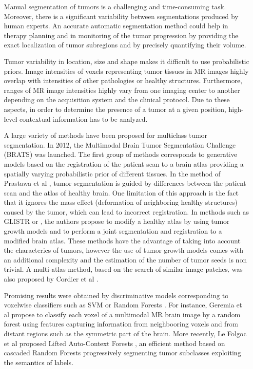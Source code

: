 \documentclass[preprint,12pt]{elsarticle}
\begin{document}
Manual segmentation of tumors is a challenging and time-consuming task. Moreover, there is a significant variability between segmentations produced by human experts. An accurate automatic segmentation method could help in therapy planning and in monitoring of the tumor progression by providing the exact localization of tumor subregions and by precisely quantifying their volume.


Tumor variability in location, size and shape makes it difficult to use probabilistic priors. Image intensities of voxels representing tumor tissues in MR images highly overlap with intensities of other pathologies or healthy structures. Furthermore, ranges of MR image intensities highly vary from one imaging center to another depending on the acquisition system and the clinical protocol. Due to these aspects, in order to determine the presence of a tumor at a given position, high-level contextual information has to be analyzed.

A large variety of methods have been proposed for multiclass tumor segmentation. In 2012, the Multimodal Brain Tumor Segmentation Challenge (BRATS) \cite{menze2015multimodal,bakas2017advancing} was launched. The first group of methods corresponds to generative models based on the registration of the patient scan to a brain atlas providing a spatially varying probabilistic prior of different tissues. In the method of Prastawa et al \cite{prastawa2004brain}, tumor segmentation is guided by differences between the patient scan and the atlas of healthy brain. One limitation of this approach is the fact that it ignores the mass effect (deformation of neighboring healthy structures) caused by the tumor, which can lead to incorrect registration. In methods such as GLISTR \cite{gooya2012glistr} or \cite{kwon2014combining}, the authors propose to modify a healthy atlas by using tumor growth models and to perform a joint segmentation and registration to a modified brain atlas. These methods have the advantage of taking into account the characterics of tumors, however the use of tumor growth models comes with an additional complexity and the estimation of the number of tumor seeds is non trivial. A multi-atlas method, based on the search of similar image patches, was also proposed by Cordier et al \cite{cordier2016patch}.


Promising results were obtained by discriminative models corresponding to voxelwise classifiers such as SVM \cite{bauer2011fully,lee2005segmenting} or Random Forests \cite{ho1995random, zikic2012decision, geremia2012spatial, le2016lifted,bauer2012segmentation,tustison2015optimal}. For instance, Geremia et al  \cite{geremia2012spatial} propose to classify each voxel of a multimodal MR brain image by a random forest using features capturing information from neighbooring voxels and from distant regions such as the symmetric part of the brain. More recently, Le Folgoc et al proposed Lifted Auto-Context Forests \cite{le2016lifted}, an efficient method based on cascaded Random Forests progressively segmenting tumor subclasses exploiting the semantics of labels. 
\end{document}
